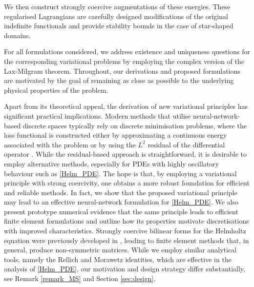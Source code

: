 \documentclass[twoside,11pt]{article}
\begin{document}
 {We then construct strongly coercive augmentations of these energies. These regularised Lagrangians are carefully designed modifications of the original indefinite functionals and provide stability bounds in the case of star-shaped domains.}


 {For all formulations considered, we address existence and uniqueness questions for the corresponding variational problems by employing the complex version of the Lax-Milgram theorem. Throughout, our derivations and proposed formulations are motivated by the goal of remaining as close as possible to the underlying physical properties of the problem.}




Apart from its theoretical appeal, the derivation of new variational principles has significant practical implications. Modern methods that utilise neural-network-based discrete spaces typically rely on discrete minimisation problems, where the loss functional is constructed either by approximating a continuous energy associated with the problem or by using the $L^2$ residual of the differential operator \cite{Karniadakis:pinn:orig:2019}. While the residual-based approach is straightforward, it  {is desirable
to employ alternative methods, especially}
for PDEs with {highly oscillatory} behaviour {such as \eqref{Helm_PDE}}.  
  { The hope is that, by employing a variational principle with strong coercivity, one obtains a more robust foundation for efficient and reliable methods. In fact, }{we show that the proposed variational principle  {may lead to} an effective neural-network formulation for \eqref{Helm_PDE}. We also present prototype numerical evidence that the same principle leads to efficient finite element formulations and outline how its properties motivate discretisations with improved characteristics.} Strongly coercive bilinear forms for the Helmholtz equation were previously developed in \cite{Moiola_Spence2014}, leading to finite element methods that, in general, produce non-symmetric matrices. While we employ similar analytical tools, namely the Rellich and Morawetz identities, which are effective in the analysis of \eqref{Helm_PDE}, our motivation and design strategy differ substantially, see Remark \ref{remark_MS} and Section \ref{sec:design}.
\end{document}

